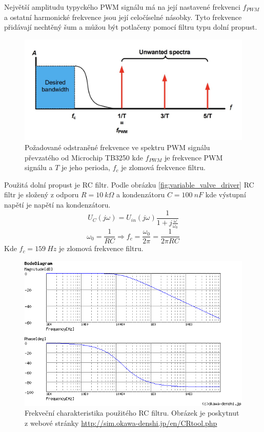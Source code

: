 Největší amplitudu typyckého PWM signálu má na její nastavené frekvenci $f_{PWM}$ a ostatní harmonické frekvence jsou její celočíselné násobky. Tyto frekvence přidávají nechtěný šum a můžou být potlačeny pomocí filtru typu dolní propust. 


\begin{figure}[H]
    \centering
    \includegraphics[width=1\linewidth]{pictures/rc_pwm_spectrum_microchip90003250A.jpg}
    \caption{Požadované odstraněné frekvence ve spektru PWM signálu převzatého od Microchip TB3250 kde $f_{PWM}$ je frekvence PWM signálu a $T$ je jeho perioda, $f_{c}$ je zlomová frekvence filtru.}
    \label{fig:unwanted_pwm_spectrum}
\end{figure}

Použitá dolní propust je RC filtr. Podle obrázku \ref{fig:variable_valve_driver} RC filtr je složený z odporu $R = 10 \ k\Omega$ a kondenzátoru $C = 100 \ nF$ kde výstupní napětí je napětí na kondenzátoru. 
\begin{equation}
    U_C(j\omega) = U_{in}(j\omega) \frac{1}{1 + j\frac{\omega}{\omega_0}}
\end{equation}
\begin{equation}
    \omega_0 = \frac{1}{RC} \Rightarrow f_c = \frac{\omega_0}{2\pi} = \frac{1}{2\pi RC} 
\end{equation}
Kde $f_c = 159 \ Hz$ je zlomová frekvence filtru.

\begin{figure}[H]
    \centering
    \includegraphics[width=1\linewidth]{pictures/var_rc_filter.png}
    \caption{Frekveční charakteristika použitého RC filtru. Obrázek je poskytnut z webové stránky \url{http://sim.okawa-denshi.jp/en/CRtool.php}}
    \label{fig:var_rc_filter_char}
\end{figure}

